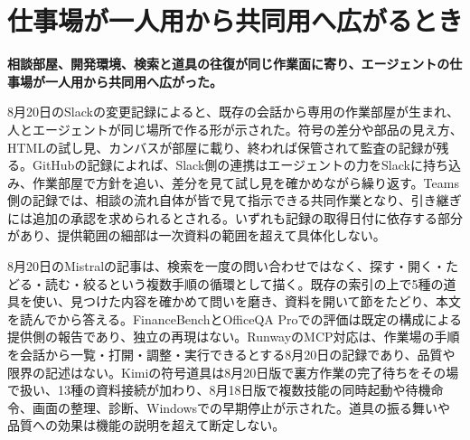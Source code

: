 \section{仕事場が一人用から共同用へ広がるとき}
\label{pkg:w34-collaborative-agent-workflows-retrieval}
\noindent\textbf{相談部屋、開発環境、検索と道具の往復が同じ作業面に寄り、エージェントの仕事場が一人用から共同用へ広がった。} \cite{w2026w34w34eventc012,w2026w34w34eventc019}\par\medskip
\noindent 8月20日のSlackの変更記録によると、既存の会話から専用の作業部屋が生まれ、人とエージェントが同じ場所で作る形が示された。符号の差分や部品の見え方、HTMLの試し見、カンバスが部屋に載り、終われば保管されて監査の記録が残る。GitHubの記録によれば、Slack側の連携はエージェントの力をSlackに持ち込み、作業部屋で方針を追い、差分を見て試し見を確かめながら繰り返す。Teams側の記録では、相談の流れ自体が皆で見て指示できる共同作業となり、引き継ぎには追加の承認を求められるとされる。いずれも記録の取得日付に依存する部分があり、提供範囲の細部は一次資料の範囲を超えて具体化しない。 \cite{w2026w34w34eventc012,w2026w34w34eventc100,w2026w34w34eventc101}\par\medskip
\noindent 8月20日のMistralの記事は、検索を一度の問い合わせではなく、探す・開く・たどる・読む・絞るという複数手順の循環として描く。既存の索引の上で5種の道具を使い、見つけた内容を確かめて問いを磨き、資料を開いて節をたどり、本文を読んでから答える。FinanceBenchとOfficeQA Proでの評価は既定の構成による提供側の報告であり、独立の再現はない。RunwayのMCP対応は、作業場の手順を会話から一覧・打開・調整・実行できるとする8月20日の記録であり、品質や限界の記述はない。Kimiの符号道具は8月20日版で裏方作業の完了待ちをその場で扱い、13種の資料接続が加わり、8月18日版で複数技能の同時起動や待機命令、画面の整理、診断、Windowsでの早期停止が示された。道具の振る舞いや品質への効果は機能の説明を超えて断定しない。 \cite{w2026w34w34eventc019,w2026w34w34eventc047,w2026w34w34eventrefreshkimicodecliv038v037}\par\medskip
